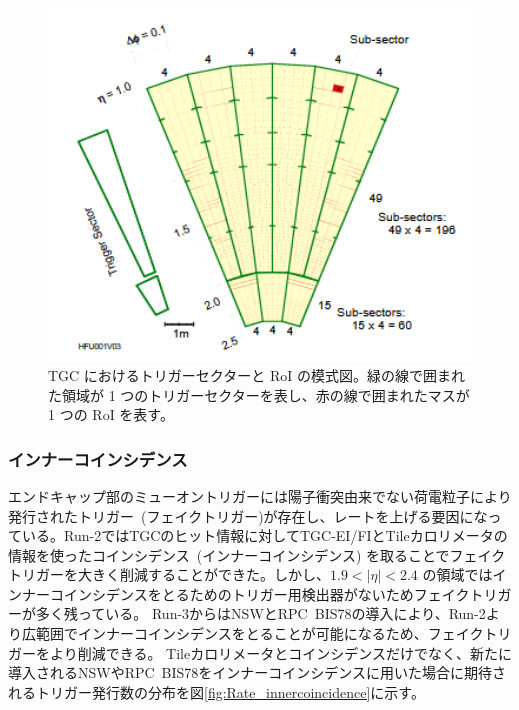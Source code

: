 \begin{figure}[tb]
  \centering
  \includegraphics[clip, width=13cm]{fig/3/RoI.png}
  \caption{TGC におけるトリガーセクターと RoI の模式図。緑の線で囲まれた領域が 1 つのトリガーセクターを表し、赤の線で囲まれたマスが 1 つの RoI を表す。}
  \label{fig:RoI}
\end{figure}

\subsubsection{インナーコインシデンス}
エンドキャップ部のミューオントリガーには陽子衝突由来でない荷電粒子により発行されたトリガー~(フェイクトリガー)が存在し、レートを上げる要因になっている。Run-2ではTGCのヒット情報に対してTGC-EI/FIとTileカロリメータの情報を使ったコインシデンス~(インナーコインシデンス) を取ることでフェイクトリガーを大きく削減することができた。しかし、$1.9 < |\eta| < 2.4$ の領域ではインナーコインシデンスをとるためのトリガー用検出器がないためフェイクトリガーが多く残っている。
Run-3からはNSWとRPC~BIS78の導入により、Run-2より広範囲でインナーコインシデンスをとることが可能になるため、フェイクトリガーをより削減できる。
Tileカロリメータとコインシデンスだけでなく、新たに導入されるNSWやRPC~BIS78をインナーコインシデンスに用いた場合に期待されるトリガー発行数の分布を図\ref{fig:Rate_innercoincidence}に示す。


